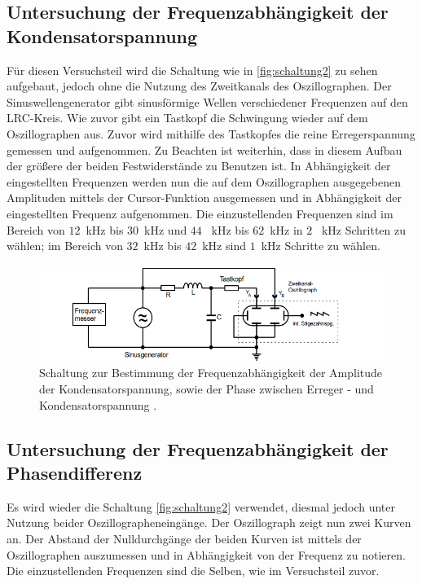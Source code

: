     \subsection{Untersuchung der Frequenzabhängigkeit der Kondensatorspannung}
        Für diesen Versuchsteil wird die Schaltung wie in \autoref{fig:schaltung2} zu sehen aufgebaut, jedoch ohne die Nutzung des Zweitkanals des Oszillographen.
        Der Sinuswellengenerator gibt sinusförmige Wellen verschiedener Frequenzen auf den LRC-Kreis. Wie zuvor gibt ein Tastkopf die Schwingung
        wieder auf dem Oszillographen aus. Zuvor wird mithilfe des Tastkopfes die reine Erregerspannung gemessen und aufgenommen. Zu Beachten 
        ist weiterhin, dass in diesem Aufbau der größere der beiden Festwiderstände zu Benutzen ist. In Abhängigkeit der eingestellten Frequenzen
        werden nun die auf dem Oszillographen ausgegebenen Amplituden mittels der Cursor-Funktion ausgemessen und in Abhängigkeit der eingestellten
        Frequenz aufgenommen. Die einzustellenden Frequenzen sind im Bereich von $12$\, kHz bis $30$\, kHz und $44$ \, kHz bis $62$\, kHz in $2$ \, kHz Schritten zu wählen;
        im Bereich von $32$\, kHz bis $42$\, kHz sind $1$\, kHz Schritte zu wählen.
        \begin{figure}
            \centering
            \includegraphics[width=\textwidth]{content/s2.png}
            \caption{Schaltung zur Bestimmung der Frequenzabhängigkeit der Amplitude der Kondensatorspannung, sowie der Phase zwischen Erreger - und Kondensatorspannung \cite[296]{V354}.}
            \label{fig:schaltung2}
        \end{figure} 
    \subsection{Untersuchung der Frequenzabhängigkeit der Phasendifferenz}
        Es wird wieder die Schaltung \autoref{fig:schaltung2} verwendet, diesmal jedoch unter Nutzung beider Oszillographeneingänge. Der Oszillograph
        zeigt nun zwei Kurven an. Der Abstand der Nulldurchgänge der beiden Kurven ist mittels der Oszillographen auszumessen und in 
        Abhängigkeit von der Frequenz zu notieren. Die einzustellenden Frequenzen sind die Selben, wie im Versuchsteil zuvor.    